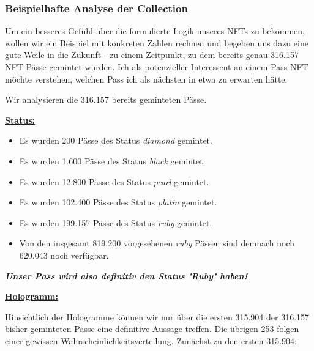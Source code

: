 
\subsubsection{Beispielhafte Analyse der Collection}

\vspace{0.2cm}

Um ein besseres Gefühl über die formulierte Logik unseres NFTs zu bekommen, wollen wir ein Beispiel mit konkreten Zahlen rechnen und begeben uns dazu eine gute Weile in die Zukunft - zu einem Zeitpunkt, zu dem bereits genau 316.157 NFT-Pässe gemintet wurden. Ich als potenzieller Interessent an einem Pass-NFT möchte verstehen, welchen Pass ich als nächsten in etwa zu erwarten hätte.

Wir analysieren die 316.157 bereits geminteten Pässe.

\vspace{0.2cm} 

\underline{\textbf{Status:}}

\begin{itemize}
  \item Es wurden 200 Pässe des Status \textit{diamond} gemintet.
  \item Es wurden 1.600 Pässe des Status \textit{black} gemintet.
  \item Es wurden 12.800 Pässe des Status \textit{pearl} gemintet.
  \item Es wurden 102.400 Pässe des Status \textit{platin} gemintet.
  \item Es wurden 199.157 Pässe des Status \textit{ruby} gemintet.
  \item Von den insgesamt 819.200 vorgesehenen \textit{ruby} Pässen sind demnach noch 620.043 noch verfügbar.
\end{itemize}

\vspace{0.2cm}

\textit{\textbf{Unser Pass wird also definitiv den Status 'Ruby' haben!}}

\vspace{0.3cm}


\underline{\textbf{Hologramm:}}

\vspace{0.2cm}

Hinsichtlich der Hologramme können wir nur über die ersten 315.904 der 316.157 bisher geminteten Pässe eine definitive Aussage treffen. Die übrigen 253 folgen einer gewissen Wahrscheinlichkeitsverteilung. Zunächst zu den ersten 315.904:

